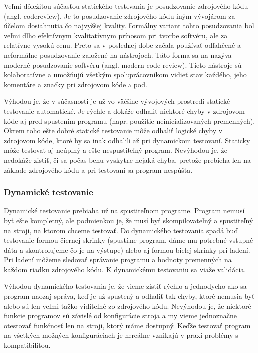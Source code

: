 \documentclass[11pt,twoside,slovak,a4paper]{article}
\begin{document}
			Veľmi dôležitou súčasťou statického testovania je posudzovanie zdrojového kódu (angl. codereview). Je to posudzovanie zdrojového kódu iným vývojárom za účelom dosiahnutia čo najvyššej kvality. Formálny variant tohto posudzovania bol veľmi dlho efektívnym kvalitatívnym prínosom pri tvorbe softvéru, ale za relatívne vysokú cenu. Preto sa v poslednej dobe začala používať odľahčené a neformálne posudzovanie založené na nástrojoch. Táto forma sa na nazýva moderné posudzovanie softvéru (angl. modern code review). Tieto nástroje sú kolaboratívne a umožňujú všetkým spoluprácovníkom vidieť stav každého, jeho komentáre a značky pri zdrojovom kóde a pod.\cite{Bosu2015} 
			
			Výhodou je, že v súčasnosti je už vo väčšine vývojových prostredí statické testovanie automatické. Je rýchle a dokáže odhaliť niektoré chyby v zdrojovom kóde aj pred spustením programu (napr. použitie neinicializovaných premenných). Okrem toho ešte dobré statické testovanie môže odhaliť logické chyby v zdrojovom kóde, ktoré by sa inak odhalili až pri dynamickom testovaní. Staticky môže testovať aj neúplný a ešte nespustiteľný program.
			Nevýhodou je, že nedokáže zistiť, či sa počas behu vyskytne nejaká chyba, pretože prebieha len na základe zdrojového kódu a pri testovaní sa program nespúšťa.
			
		\subsubsection{Dynamické testovanie}
			Dynamické testovanie prebiaha už na spustiteľnom programe. Program nemusí byť ešte kompletný, ale podmienkou je, že musí byť skompilovateľný a spustiteľný na stroji, na ktorom chceme testovať. Do dynamického testovania spadá buď testovanie formou čiernej skrinky (spustíme program, dáme mu potrebné vstupné dáta a skontrolujeme čo je na výstupe) alebo aj formou bielej skrinky pri ladení. Pri ladení môžeme sledovať správanie programu a hodnoty premenných na každom riadku zdrojového kódu. K dynamickému testovaniu sa viaže validácia.
			
			Výhodou dynamického testovania je, že vieme zistiť rýchlo a jednodycho ako sa program naozaj správa, keď je už spustený a odhaliť tak chyby, ktoré nemusia byť alebo sú len veľmi ťažko viditeľné zo zdrojového kódu.
			Nevýhodou je, že niektoré funkcie programov sú závislé od konfigurácie stroja a my vieme jednoznačne otestovať funkčnosť len na stroji, ktorý máme dostupný. Keďže testovať program na všetkých možných konfiguráciach je nereálne vznikajú v praxi problémy s kompatibilitou.
	
\end{document}
